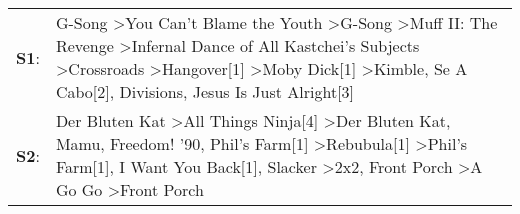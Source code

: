 \begin{supertabular}{p{0.03\textwidth}p{0.92\textwidth}}
 \textbf{S1}:  &                         G-Song\textsuperscript{} \textgreater \enspace You Can't Blame the Youth\textsuperscript{} \textgreater \enspace G-Song\textsuperscript{} \textgreater \enspace Muff II: The Revenge\textsuperscript{} \textgreater \enspace Infernal Dance of All Kastchei's Subjects\textsuperscript{} \textgreater \enspace Crossroads\textsuperscript{} \textgreater \enspace Hangover[1]\textsuperscript{} \textgreater \enspace Moby Dick[1]\textsuperscript{} \textgreater \enspace Kimble\textsuperscript{}, \enspace Se A Cabo[2]\textsuperscript{}, \enspace Divisions\textsuperscript{}, \enspace Jesus Is Just Alright[3]\textsuperscript{}  \enspace  \\
 \textbf{S2}:  &  Der Bluten Kat\textsuperscript{} \textgreater \enspace All Things Ninja[4]\textsuperscript{} \textgreater \enspace Der Bluten Kat\textsuperscript{}, \enspace Mamu\textsuperscript{}, \enspace Freedom! '90\textsuperscript{}, \enspace Phil's Farm[1]\textsuperscript{} \textgreater \enspace Rebubula[1]\textsuperscript{} \textgreater \enspace Phil's Farm[1]\textsuperscript{}, \enspace I Want You Back[1]\textsuperscript{}, \enspace Slacker\textsuperscript{} \textgreater \enspace 2x2\textsuperscript{}, \enspace Front Porch\textsuperscript{} \textgreater \enspace A Go Go\textsuperscript{} \textgreater \enspace Front Porch\textsuperscript{}  \enspace  \\
\end{supertabular}
